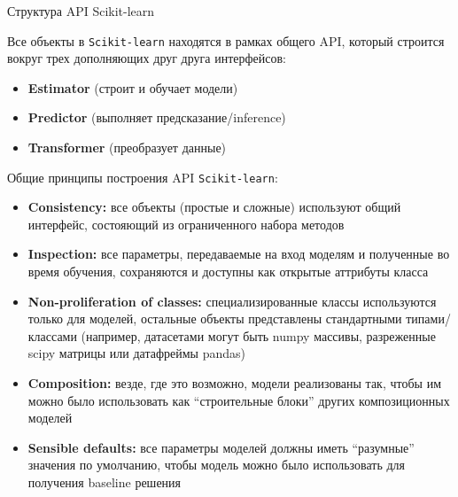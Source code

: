 \documentclass{beamer}
\begin{document}
\begin{frame}{Структура API Scikit-learn}
    \small

    Все объекты в \texttt{Scikit-learn} находятся в рамках общего API, который строится вокруг трех дополняющих друг друга интерфейсов:

    \begin{itemize}
        \scriptsize
        \item \textbf{Estimator} (строит и обучает модели)
        \item \textbf{Predictor} (выполняет предсказание/inference)
        \item \textbf{Transformer} (преобразует данные)
    \end{itemize}

    Общие принципы построения API \texttt{Scikit-learn}:
    \begin{itemize}
        \scriptsize
        \item \textbf{Consistency:} все объекты (простые и сложные) используют общий интерфейс, состояющий из ограниченного набора методов
        \item \textbf{Inspection:} все параметры, передаваемые на вход моделям и полученные во время обучения, сохраняются и доступны как открытые аттрибуты класса
        \item \textbf{Non-proliferation of classes:} специализированные классы используются только для моделей, остальные объекты представлены стандартными типами/классами (например, датасетами могут быть numpy массивы, разреженные scipy матрицы или датафреймы pandas)
        \item \textbf{Composition:} везде, где это возможно, модели реализованы так, чтобы им можно было использовать как ``строительные блоки'' других композиционных моделей
        \item \textbf{Sensible defaults:} все параметры моделей должны иметь ``разумные'' значения по умолчанию, чтобы модель можно было использовать для получения baseline решения
    \end{itemize}
\end{frame}
\end{document}
